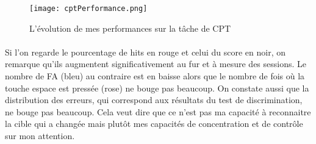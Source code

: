 \begin{figure}[H]
    \begin{center}
    \texttt{[image: cptPerformance.png]}
    \end{center}
    \caption{L'évolution de mes performances sur la tâche de CPT}
\label{CptPerformance}
\end{figure}

\paragraph{}Si l'on regarde le pourcentage de hits en rouge et celui du score en noir, on remarque qu'ils augmentent significativement au fur et à mesure des sessions. Le nombre de FA
(bleu) au contraire est en baisse alors que le nombre de fois où la touche espace est pressée (rose) ne bouge pas beaucoup. On constate aussi que la distribution des erreurs, qui
correspond aux résultats du test de discrimination, ne bouge pas beaucoup. Cela veut dire que ce n'est pas ma capacité à reconnaitre la cible qui a changée mais plutôt mes capacités
de concentration et de contrôle sur mon attention.